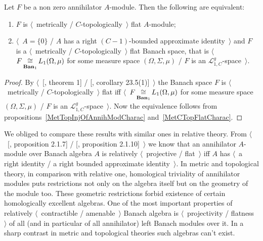 \begin{proposition}\label{MetTopFlatAnnihModCharac} Let $F$ be a non zero
annihilator $A$-module. Then the following are equivalent:

\begin{enumerate}[label = (\roman*)]
    \item $F$ is $\langle$~metrically / $C$-topologically~$\rangle$ flat
    $A$-module;

    \item $\langle$~$A= \{0 \}$ / $A$ has a right $(C-1)$-bounded approximate
    identity~$\rangle$ and $F$ is a $\langle$~metrically /
    $C$-topologically~$\rangle$ flat Banach space, that is
    $\langle$~$F\mathop{\mathbin{\cong}}\limits_{\mathbf{Ban}_1}L_1(\Omega,\mu)$ for some measure space
    $(\Omega, \Sigma, \mu)$ / $F$ is an $\mathscr{L}_{1,C}^g$-space~$\rangle$.
\end{enumerate}
\end{proposition}
\begin{proof} By $\langle$~[\cite{GrothMetrProjFlatBanSp}, theorem 1] /
[\cite{DefFloTensNorOpId}, corollary 23.5(1)]~$\rangle$ the Banach space $F$ is
$\langle$~metrically / $C$-topologically~$\rangle$ flat iff
$\langle$~$F\mathop{\mathbin{\cong}}\limits_{\mathbf{Ban}_1}L_1(\Omega,\mu)$ for some measure space
$(\Omega, \Sigma, \mu)$ / $F$ is an $\mathscr{L}_{1,C}^g$-space~$\rangle$. Now
the equivalence follows from propositions~\ref{MetTopInjOfAnnihModCharac}
and~\ref{MetCTopFlatCharac}.
\end{proof}

We obliged to compare these results with similar ones in relative theory. From
$\langle$~[\cite{RamsHomPropSemgroupAlg}, proposition 2.1.7] /
[\cite{RamsHomPropSemgroupAlg}, proposition 2.1.10]~$\rangle$ we know that an
annihilator $A$-module over Banach algebra $A$ is relatively
$\langle$~projective / flat~$\rangle$ iff $A$ has $\langle$~a right identity / a
right bounded approximate identity~$\rangle$.   
In metric and topological theory, in comparison with relative one, homological
triviality of annihilator modules puts restrictions not only on the algebra
itself but on the geometry of the module too. These geometric restrictions
forbid existence of certain homologically excellent algebras. One of the most
important properties of relatively $\langle$~contractible / amenable~$\rangle$
Banach algebra is $\langle$~projectivity / flatness~$\rangle$ of all (and in
particular of all annihilator) left Banach modules over it. In a sharp contrast
in metric and topological theories such algebras can't exist.

